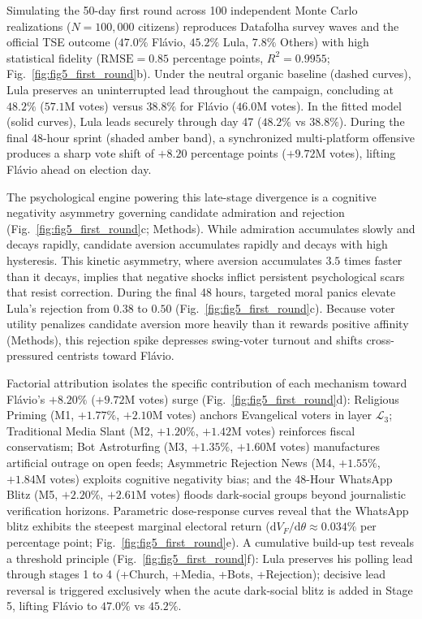 \documentclass[11pt,a4paper]{article}
\begin{document}
Simulating the 50-day first round across 100 independent Monte Carlo realizations ($N = 100{,}000$ citizens) reproduces Datafolha survey waves and the official TSE outcome ($47.0\%$ Flávio, $45.2\%$ Lula, $7.8\%$ Others) with high statistical fidelity ($\mathrm{RMSE} = 0.85$ percentage points, $R^2 = 0.9955$; Fig.~\ref{fig:fig5_first_round}b). Under the neutral organic baseline (dashed curves), Lula preserves an uninterrupted lead throughout the campaign, concluding at $48.2\%$ ($57.1\mathrm{M}$ votes) versus $38.8\%$ for Flávio ($46.0\mathrm{M}$ votes). In the fitted model (solid curves), Lula leads securely through day 47 ($48.2\%$ vs $38.8\%$). During the final 48-hour sprint (shaded amber band), a synchronized multi-platform offensive produces a sharp vote shift of $+8.20$ percentage points ($+9.72\mathrm{M}$ votes), lifting Flávio ahead on election day.

The psychological engine powering this late-stage divergence is a cognitive negativity asymmetry governing candidate admiration and rejection (Fig.~\ref{fig:fig5_first_round}c; Methods). While admiration accumulates slowly and decays rapidly, candidate aversion accumulates rapidly and decays with high hysteresis. This kinetic asymmetry, where aversion accumulates $3.5$ times faster than it decays, implies that negative shocks inflict persistent psychological scars that resist correction. During the final 48 hours, targeted moral panics elevate Lula's rejection from $0.38$ to $0.50$ (Fig.~\ref{fig:fig5_first_round}c). Because voter utility penalizes candidate aversion more heavily than it rewards positive affinity (Methods), this rejection spike depresses swing-voter turnout and shifts cross-pressured centrists toward Flávio.

Factorial attribution isolates the specific contribution of each mechanism toward Flávio's $+8.20\%$ ($+9.72\mathrm{M}$ votes) surge (Fig.~\ref{fig:fig5_first_round}d): Religious Priming (M1, $+1.77\%$, $+2.10\mathrm{M}$ votes) anchors Evangelical voters in layer $\mathcal{L}_3$; Traditional Media Slant (M2, $+1.20\%$, $+1.42\mathrm{M}$ votes) reinforces fiscal conservatism; Bot Astroturfing (M3, $+1.35\%$, $+1.60\mathrm{M}$ votes) manufactures artificial outrage on open feeds; Asymmetric Rejection News (M4, $+1.55\%$, $+1.84\mathrm{M}$ votes) exploits cognitive negativity bias; and the 48-Hour WhatsApp Blitz (M5, $+2.20\%$, $+2.61\mathrm{M}$ votes) floods dark-social groups beyond journalistic verification horizons. Parametric dose-response curves reveal that the WhatsApp blitz exhibits the steepest marginal electoral return ($\mathrm{d}V_F/\mathrm{d}\theta \approx 0.034\%$ per percentage point; Fig.~\ref{fig:fig5_first_round}e). A cumulative build-up test reveals a threshold principle (Fig.~\ref{fig:fig5_first_round}f): Lula preserves his polling lead through stages 1 to 4 (+Church, +Media, +Bots, +Rejection); decisive lead reversal is triggered exclusively when the acute dark-social blitz is added in Stage 5, lifting Flávio to $47.0\%$ vs $45.2\%$.
\end{document}
